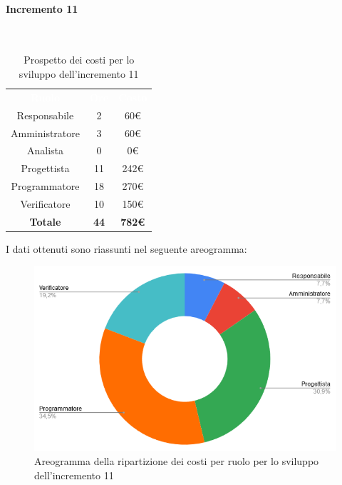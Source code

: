 \paragraph*{Incremento 11}\mbox{} \\
\begin{table}[H]
\centering\renewcommand{\arraystretch}{1.5}
\caption{Prospetto dei costi per lo sviluppo dell'incremento 11}
\vspace{0.2cm}
\begin{tabular}{ c c c }
\rowcolor{redafk}
\textcolor{white}{\textbf{Ruolo}} & \textcolor{white}{\textbf{Ore}} &
\textcolor{white}{\textbf{Costo}}  \\
Responsabile & 2 & 60€ \\
Amministratore & 3 & 60€ \\
Analista & 0 & 0€ \\
Progettista & 11 & 242€ \\
Programmatore & 18 & 270€  \\
Verificatore & 10 & 150€  \\
\rowcolor{lastrowcolor}
\textbf{Totale} & \textbf{44} & \textbf{782€}  \\
\end{tabular}
\end{table}
 
I dati ottenuti sono riassunti nel seguente areogramma:
\begin{figure}[H]
\centering
\includegraphics[scale=0.60]{img/grafici/torta_inc11.png}
\caption{Areogramma della ripartizione dei costi per ruolo per lo sviluppo dell'incremento 11}
\end{figure}

